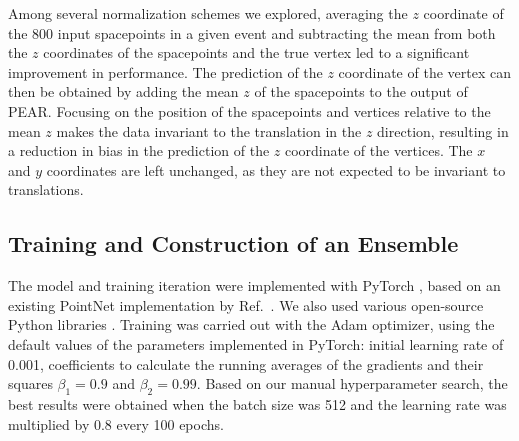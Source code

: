 \documentclass[a4paper,11pt]{article}
\begin{document}
Among several normalization schemes we explored, averaging the $z$ coordinate of the 800 input spacepoints in a given event and subtracting the mean from both the $z$ coordinates of the spacepoints and the true vertex led to a significant improvement in performance. The prediction of the $z$ coordinate of the vertex can then be obtained by adding the mean $z$ of the spacepoints to the output of PEAR. Focusing on the position of the spacepoints and vertices relative to the mean $z$ makes the data invariant to the translation in the $z$ direction, resulting in a reduction in bias in the prediction of the $z$ coordinate of the vertices. The $x$ and $y$ coordinates are left unchanged, as they are not expected to be invariant to translations. 

\subsection{\label{subsec:training-description}Training and Construction of an Ensemble}
The model and training iteration were implemented with PyTorch \cite{NEURIPS2019_bdbca288}, based on an existing PointNet implementation by Ref.~\cite{Xu_pointnet_2019}. We also used various open-source Python libraries \cite{numpy, scipy, matplotlib, h5py, iminuit}.
Training was carried out with the Adam optimizer, using the default values of the parameters implemented in PyTorch: initial learning rate of 0.001, coefficients to calculate the running averages of the gradients and their squares $\beta_1 = 0.9$ and $\beta_2=0.99$. Based on our manual hyperparameter search, the best results were obtained when the batch size was 512 and the learning rate was multiplied by 0.8 every 100 epochs.
\end{document}
